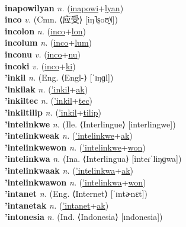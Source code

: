  \label{inapowilon} \\
\textbf{inapowilyan} \textit{n.} (\hyperref[inapowi]{inapowi}+\hyperref[lyan]{lyan})
 \label{inapowilyan} \\
\textbf{inco} \textit{v.} (Cmn. ⟨应受⟩ [iŋ˥ʂoʊ̯˥˩])
 \label{inco} \\
\textbf{incolon} \textit{n.} (\hyperref[inco]{inco}+\hyperref[lon]{lon})
 \label{incolon} \\
\textbf{incolum} \textit{n.} (\hyperref[inco]{inco}+\hyperref[lum]{lum})
 \label{incolum} \\
\textbf{inconu} \textit{v.} (\hyperref[inco]{inco}+\hyperref[nu]{nu})
 \label{inconu} \\
\textbf{incoki} \textit{v.} (\hyperref[inco]{inco}+\hyperref[ki]{ki})
 \label{incoki} \\
\textbf{'inkil} \textit{n.} (Eng. ⟨Engl-⟩ [ˈɪŋɡl])
 \label{'inkil} \\
\textbf{'inkilak} \textit{n.} (\hyperref['inkil]{'inkil}+\hyperref[ak]{ak})
 \label{'inkilak} \\
\textbf{'inkiltec} \textit{n.} (\hyperref['inkil]{'inkil}+\hyperref[tec]{tec})
 \label{'inkiltec} \\
\textbf{'inkiltilip} \textit{n.} (\hyperref['inkil]{'inkil}+\hyperref[tilip]{tilip})
 \label{'inkiltilip} \\
\textbf{'intelinkwe} \textit{n.} (Ile. ⟨Interlingue⟩ [interlingwe])
 \label{'intelinkwe} \\
\textbf{'intelinkweak} \textit{n.} (\hyperref['intelinkwe]{'intelinkwe}+\hyperref[ak]{ak})
 \label{'intelinkweak} \\
\textbf{'intelinkwewon} \textit{n.} (\hyperref['intelinkwe]{'intelinkwe}+\hyperref[won]{won})
 \label{'intelinkwewon} \\
\textbf{'intelinkwa} \textit{n.} (Ina. ⟨Interlingua⟩ [inteɾˈliŋɡwa])
 \label{'intelinkwa} \\
\textbf{'intelinkwaak} \textit{n.} (\hyperref['intelinkwa]{'intelinkwa}+\hyperref[ak]{ak})
 \label{'intelinkwaak} \\
\textbf{'intelinkwawon} \textit{n.} (\hyperref['intelinkwa]{'intelinkwa}+\hyperref[won]{won})
 \label{'intelinkwawon} \\
\textbf{'intanet} \textit{n.} (Eng. ⟨Internet⟩ [ˈɪntɚnɛt])
 \label{'intanet} \\
\textbf{'intanetak} \textit{n.} (\hyperref['intanet]{'intanet}+\hyperref[ak]{ak})
 \label{'intanetak} \\
\textbf{'intonesia} \textit{n.} (Ind. ⟨Indonesia⟩ [ɪndonesia])

